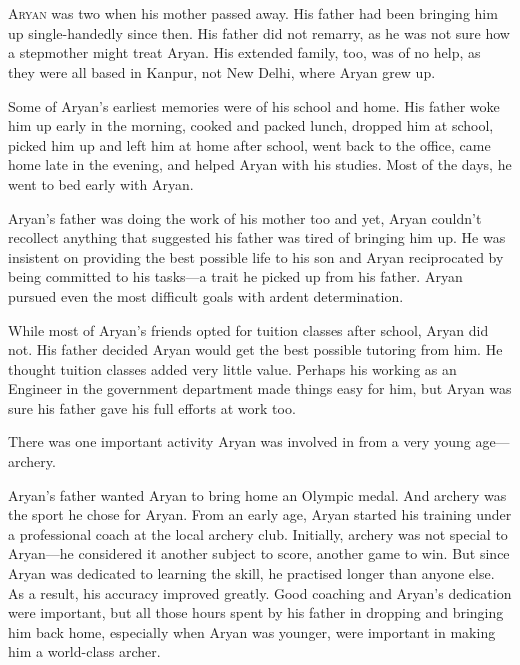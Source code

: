 \chapter{}

\lettrine{A}{ryan} was two when his mother passed away. His father had been bringing him up
single-handedly since then. His father did not remarry, as he was not sure how a
stepmother might treat Aryan. His extended family, too, was of no help, as
they were all based in Kanpur, not New Delhi, where Aryan grew up.

Some of Aryan's earliest memories were of his school and home. His father woke
him up early in the morning, cooked and packed lunch, dropped him at school,
picked him up and left him at home after school, went back to the office, came home
late in the evening, and helped Aryan with his studies. Most of the days, he went to bed
early with Aryan.

Aryan's father was doing the work of his mother too and yet, Aryan couldn't
recollect anything that suggested his father was tired of bringing him up. He
was insistent on providing the best possible life to his son and Aryan
reciprocated by being committed to his tasks—a trait he picked up from his
father. Aryan pursued even the most difficult goals with ardent determination.

While most of Aryan's friends opted for tuition classes after school, Aryan did
not. His father decided Aryan would get the best possible tutoring from him. He
thought tuition classes added very little value. Perhaps his working as an
Engineer in the government department made things easy for him, but Aryan was
sure his father gave his full efforts at work too.

There was one important activity Aryan was involved in from a very young age—archery.

Aryan's father wanted Aryan to bring home an Olympic medal. And archery was the
sport he chose for Aryan. From an early age, Aryan started his training under a
professional coach at the local archery club. Initially, archery was not special
to Aryan—he considered it another subject to score, another game to win.
But since Aryan was dedicated to learning the skill, he practised longer than
anyone else. As a result, his accuracy improved greatly. Good coaching and
Aryan's dedication were important, but all those hours spent by his father in
dropping and bringing him back home, especially when Aryan was younger, were
important in making him a world-class archer.

